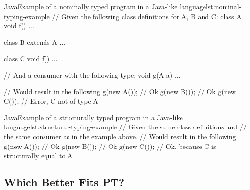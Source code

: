 %
%
%
%
%




\begin{code}{Java}{Example of a nominally typed program in a Java-like language}{lst:nominal-typing-example}
    // Given the following class definitions for A, B and C:
    class A {
        void f() {
            ...
        }
    }

    class B extends A {
        ...
    }

    class C {
        void f() {
            ...
        }
    }

    // And a consumer with the following type:
    void g(A a) { ... }

    // Would result in the following
    g(new A()); // Ok
    g(new B()); // Ok
    g(new C()); // Error, C not of type A
\end{code}


\begin{code}{Java}{Example of a structurally typed program in a Java-like language}{lst:structural-typing-example}
    // Given the same class definitions and
    // the same consumer as in the example above.
    // Would result in the following
    g(new A()); // Ok
    g(new B()); // Ok
    g(new C()); // Ok, because C is structurally equal to A
\end{code}

\subsection{Which Better Fits PT?}\label{subsec:which-better-fits-pt?}

